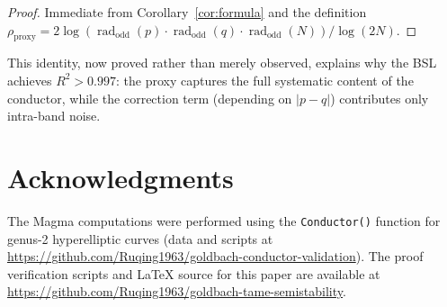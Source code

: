 \documentclass[11pt,a4paper]{article}
\newcommand{\rad}{\operatorname{rad}}
\theoremstyle{definition}
\theoremstyle{remark}
\begin{document}
\begin{proof}
  Immediate from Corollary~\ref{cor:formula} and the definition
  $\rho_{\mathrm{proxy}} = 2\log(\rad_{\mathrm{odd}}(p) \cdot
  \rad_{\mathrm{odd}}(q) \cdot \rad_{\mathrm{odd}}(N)) / \log(2N)$.
\end{proof}

\noindent
This identity, now proved rather than merely observed, explains why
the BSL achieves $R^2 > 0.997$: the proxy captures the full
systematic content of the conductor, while the correction
term (depending on $|p - q|$) contributes only intra-band noise.


\section*{Acknowledgments}

The Magma computations were performed using the
\texttt{Conductor()} function for genus-2 hyperelliptic curves
(data and scripts at\\
\url{https://github.com/Ruqing1963/goldbach-conductor-validation}).
The proof verification scripts and \LaTeX{} source for this paper
are available at\\
\url{https://github.com/Ruqing1963/goldbach-tame-semistability}.
\end{document}
